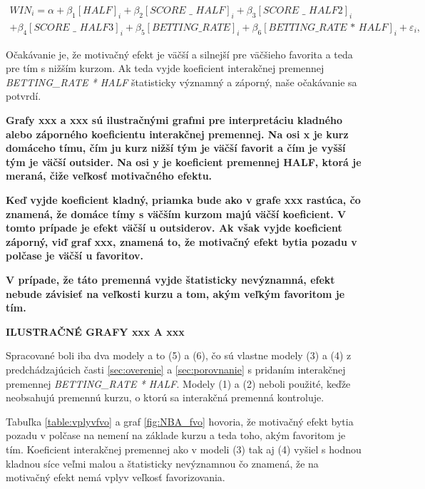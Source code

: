\documentclass[
  digital, %
  oneside, %
  notable,   %
  lof,     %
  lot,     %
]{fithesis3}
\begin{document}
	\begin{multline}
	WIN_{i} = \alpha + \beta _{1} [\textit{HALF}]_{i} + \beta _{2} [\textit{SCORE~\_~HALF}]_{i} + \beta _{3} [\textit{SCORE~\_~HALF2}]_{i} \\
	+ \beta _{4} [\textit{SCORE~\_~HALF3}]_{i} + \beta _{5} [\textit{BETTING\_RATE}]_{i} + \beta _{6} [\textit{BETTING\_RATE * HALF}]_{i} + \varepsilon_{i},
	\end{multline}
	
	Očakávanie je, že motivačný efekt je väčší a silnejší pre väčšieho favorita a teda pre tím s nižším kurzom. Ak teda vyjde koeficient interakčnej premennej \textit{BETTING\_RATE * HALF} štatisticky významný  a záporný, naše očakávanie sa potvrdí. 
	
\textbf{Grafy xxx a xxx sú ilustračnými grafmi pre interpretáciu kladného alebo záporného koeficientu interakčnej premennej. Na osi x je kurz domáceho tímu, čím ju kurz nižší tým je väčší favorit a čím je vyšší tým je väčší outsider. Na osi y je koeficient premennej HALF, ktorá je meraná, čiže veľkosť motivačného efektu.}

\textbf{Keď vyjde koeficient kladný, priamka bude ako v grafe xxx rastúca, čo znamená, že domáce tímy s väčším kurzom majú väčší koeficient. V tomto prípade je efekt väčší u outsiderov. Ak však vyjde koeficient záporný, viď graf xxx, znamená to, že motivačný efekt bytia pozadu v polčase je väčší u favoritov.}
	
\textbf{V prípade, že táto premenná vyjde štatisticky nevýznamná, efekt nebude závisieť na veľkosti kurzu a tom, akým veľkým favoritom je tím.}
	
\textbf{ILUSTRAČNÉ GRAFY xxx A xxx}
	
	Spracované boli iba dva modely a to (5) a (6), čo sú vlastne modely (3) a (4) z predchádzajúcich časti \ref{sec:overenie} a \ref{sec:porovnanie} s pridaním interakčnej premennej \textit{BETTING\_RATE * HALF}.  Modely (1) a (2) neboli použité, keďže neobsahujú premennú kurzu, o ktorú sa interakčná premenná kontroluje.
	
	Tabuľka \ref{table:vplyvfvo} a graf \ref{fig:NBA_fvo}  hovoria, že motivačný efekt bytia pozadu v polčase na nemení na základe kurzu a teda toho, akým favoritom je tím. Koeficient interakčnej premennej ako v modeli (3) tak aj (4) vyšiel s hodnou kladnou síce veľmi malou a štatisticky nevýznamnou čo znamená, že na motivačný efekt nemá vplyv veľkosť favorizovania. 
	
\end{document}
